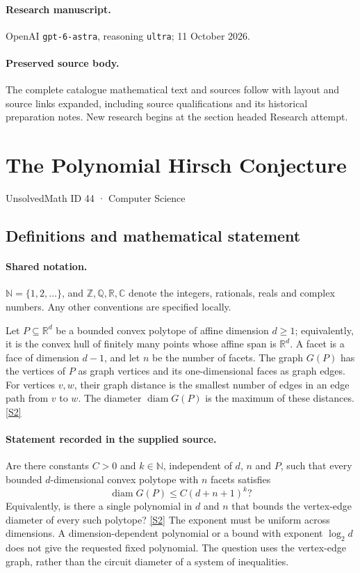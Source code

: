 \documentclass[11pt]{article}
\begin{document}
\paragraph{Research manuscript.} OpenAI \texttt{gpt-6-astra}, reasoning \texttt{ultra}; 11 October 2026.
\paragraph{Preserved source body.} The complete catalogue mathematical text and sources follow with layout and source links expanded, including source qualifications and its historical preparation notes. New research begins at the section headed Research attempt.

\section{The Polynomial Hirsch Conjecture}\label{44}
{\small UnsolvedMath ID 44 · Computer Science}
\subsection{Definitions and mathematical statement}

\paragraph{Shared notation.}$\mathbb N=\{1,2,\ldots\}$, and $\mathbb Z,\mathbb Q,\mathbb R,\mathbb C$ denote the integers, rationals, reals and complex numbers. Any other conventions are specified locally.


Let $P\subseteq\mathbb R^d$ be a bounded convex polytope of affine dimension $d\ge1$; equivalently, it is the convex hull of finitely many points whose affine span is $\mathbb R^d$. A facet is a face of dimension $d-1$, and let $n$ be the number of facets. The graph $G(P)$ has the vertices of $P$ as graph vertices and its one-dimensional faces as graph edges. For vertices $v,w$, their graph distance is the smallest number of edges in an edge path from $v$ to $w$. The diameter $\operatorname{diam}G(P)$ is the maximum of these distances. \href{https://arxiv.org/pdf/1006.2814}{[S2]}
\paragraph{Statement recorded in the supplied source.}
Are there constants $C>0$ and $k\in\mathbb N$, independent of $d$, $n$ and $P$, such that every bounded $d$-dimensional convex polytope with $n$ facets satisfies
\[
 \operatorname{diam}G(P)\le C(d+n+1)^k?
\]
Equivalently, is there a single polynomial in $d$ and $n$ that bounds the vertex-edge diameter of every such polytope? \href{https://arxiv.org/pdf/1006.2814}{[S2]}
The exponent must be uniform across dimensions. A dimension-dependent polynomial or a bound with exponent $\log_2 d$ does not give the requested fixed polynomial. The question uses the vertex-edge graph, rather than the circuit diameter of a system of inequalities.
\end{document}
